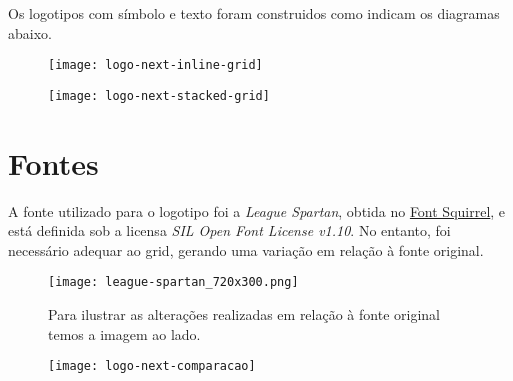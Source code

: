 \documentclass{manualmarca}
\begin{document}

\noindent Os logotipos com símbolo e texto foram construidos como indicam os diagramas abaixo.

\begin{figure}[!htp]
  \centering
  \texttt{[image: logo-next-inline-grid]}
\end{figure}


\begin{figure}[!htp]
  \centering
  \texttt{[image: logo-next-stacked-grid]}
\end{figure}


\pagebreak[4]

\section{Fontes}
\label{sec:fontes-padrao}

A fonte utilizado para o logotipo foi a \emph{League Spartan}, obtida no \href{https://www.fontsquirrel.com/fonts/league-spartan}{Font Squirrel}, e está definida sob a licensa \emph{SIL Open Font License v1.10}. No entanto, foi necessário adequar ao grid, gerando uma variação em relação à fonte original.

\vspace*{1cm}

\begin{figure}[!htp]
  \centering
  \texttt{[image: league-spartan\_720x300.png]}
\end{figure}


\begin{figure}[!htp]
  \centering
  \begin{minipage}[l]{.32\textwidth}
    Para ilustrar as alterações realizadas em relação à fonte original temos a imagem ao lado.
  \end{minipage}%
  \hfill%
  \begin{minipage}[r]{.6\textwidth}
    \centering
    \texttt{[image: logo-next-comparacao]}
  \end{minipage}
\end{figure}

\end{document}
